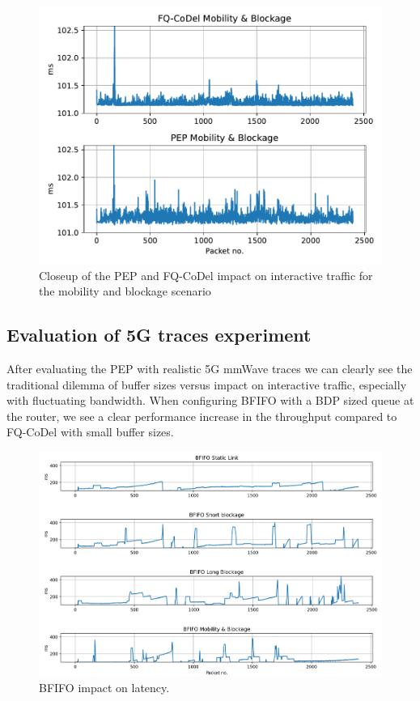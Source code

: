 \documentclass[a4paper,english, 12pt]{report}
\begin{document}
\begin{figure}[!h!] %
	\centering
	\includegraphics[scale=0.70]{../diagrams/witestlab/throughput/latency_mobb_closeup.pdf}
  	\caption{Closeup of the PEP and FQ-CoDel impact on interactive traffic for the mobility and blockage scenario}
  	\label{fig:throughput_latency_closeup_mobb}
\end{figure}

\subsection{Evaluation of 5G traces experiment}
After evaluating the PEP with realistic 5G mmWave traces we can clearly see the traditional dilemma of buffer sizes versus impact on interactive traffic, especially with fluctuating bandwidth. When configuring BFIFO with a BDP sized queue at the router, we see a clear performance increase in the throughput compared to FQ-CoDel with small buffer sizes.\\

\begin{figure}[!h!] %
	\centering
	\includegraphics[scale=0.45]{../diagrams/witestlab/throughput/latency_bfifo_all.png}
  	\caption{BFIFO impact on latency.}
  	\label{fig:throughput_all_latency_bfifo}
\end{figure}
\end{document}
